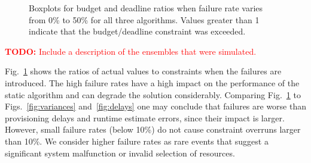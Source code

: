 \documentclass[conference]{IEEEtran}
\newcommand{\TODO}[1]{
  {\Large \textcolor{red}{\textbf{TODO: }#1}}
}
\begin{document}
\begin{figure}[tb]
    \hspace{2cm}
    \caption{Boxplots for budget and deadline ratios when failure rate varies
    from 0\% to 50\% for all three algorithms. Values greater than 1 indicate 
    that the budget/deadline constraint was exceeded.}
    \label{fig:failures}
\end{figure}

\TODO{Include a description of the ensembles that were simulated.}

Fig.~\ref{fig:failures} shows the ratios of actual values to constraints when
the failures are introduced. The high failure rates have a high impact on the
performance of the static algorithm and can degrade the solution considerably.
Comparing Fig.~\ref{fig:failures} to Figs.~\ref{fig:variances}
and~\ref{fig:delays} one may conclude that failures are worse than
provisioning delays and runtime estimate errors, since their impact is larger.
However, small failure rates (below 10\%) do not cause constraint overruns
larger than 10\%. We consider higher failure rates as rare events that suggest
a significant system malfunction or invalid selection of resources.
\end{document}
